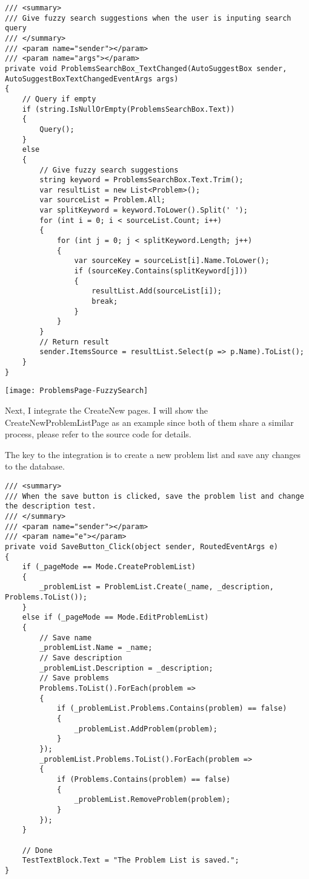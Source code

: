 \documentclass[report.tex]{subfiles}
\begin{document}
\begin{verbatim}
/// <summary>
/// Give fuzzy search suggestions when the user is inputing search query
/// </summary>
/// <param name="sender"></param>
/// <param name="args"></param>
private void ProblemsSearchBox_TextChanged(AutoSuggestBox sender, AutoSuggestBoxTextChangedEventArgs args)
{
    // Query if empty
    if (string.IsNullOrEmpty(ProblemsSearchBox.Text))
    {
        Query();
    }
    else
    {
        // Give fuzzy search suggestions
        string keyword = ProblemsSearchBox.Text.Trim();
        var resultList = new List<Problem>();
        var sourceList = Problem.All;
        var splitKeyword = keyword.ToLower().Split(' ');
        for (int i = 0; i < sourceList.Count; i++)
        {
            for (int j = 0; j < splitKeyword.Length; j++)
            {
                var sourceKey = sourceList[i].Name.ToLower();
                if (sourceKey.Contains(splitKeyword[j]))
                {
                    resultList.Add(sourceList[i]);
                    break;
                }
            }
        }
        // Return result
        sender.ItemsSource = resultList.Select(p => p.Name).ToList();
    }
}
\end{verbatim}

\texttt{[image: ProblemsPage-FuzzySearch]}

Next, I integrate the CreateNew pages. I will show the CreateNewProblemListPage as an example since both of them share a similar process, please refer to the source code for details.

The key to the integration is to create a new problem list and save any changes to the database.

\begin{verbatim}
/// <summary>
/// When the save button is clicked, save the problem list and change the description test.
/// </summary>
/// <param name="sender"></param>
/// <param name="e"></param>
private void SaveButton_Click(object sender, RoutedEventArgs e)
{
    if (_pageMode == Mode.CreateProblemList)
    {
        _problemList = ProblemList.Create(_name, _description, Problems.ToList());
    }
    else if (_pageMode == Mode.EditProblemList)
    {
        // Save name
        _problemList.Name = _name;
        // Save description
        _problemList.Description = _description;
        // Save problems
        Problems.ToList().ForEach(problem =>
        {
            if (_problemList.Problems.Contains(problem) == false)
            {
                _problemList.AddProblem(problem);
            }
        });
        _problemList.Problems.ToList().ForEach(problem =>
        {
            if (Problems.Contains(problem) == false)
            {
                _problemList.RemoveProblem(problem);
            }
        });
    }

    // Done
    TestTextBlock.Text = "The Problem List is saved.";
}
\end{verbatim}
\end{document}
